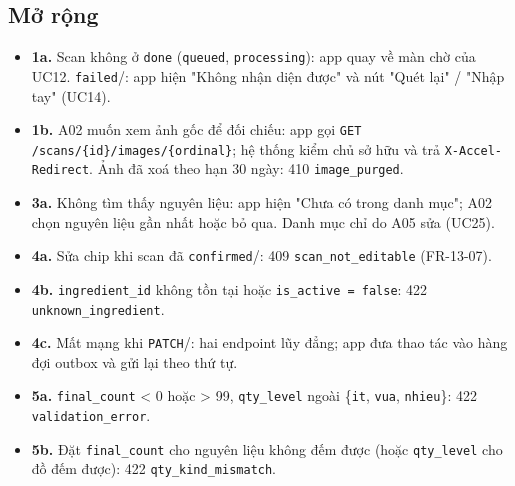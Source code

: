 \subsection{Mở rộng}
\begin{itemize}
\item \textbf{1a.} Scan không ở {\small\texttt{done}} ({\small\texttt{queued}}, {\small\texttt{processing}}): app quay về màn chờ của UC12. {\small\texttt{failed}}/: app hiện "Không nhận diện được" và nút "Quét lại" /\allowbreak{} "Nhập tay" (UC14).
\item \textbf{1b.} A02 muốn xem ảnh gốc để đối chiếu: app gọi {\small\texttt{GET /\allowbreak{}\allowbreak{}scans/\allowbreak{}\allowbreak{}\{id\}/\allowbreak{}\allowbreak{}images/\allowbreak{}\allowbreak{}\{ordinal\}}}; hệ thống kiểm chủ sở hữu và trả {\small\texttt{X-\allowbreak{}Accel-\allowbreak{}Redirect}}. Ảnh đã xoá theo hạn 30 ngày: 410 {\small\texttt{image\_\allowbreak{}\allowbreak{}purged}}.
\item \textbf{3a.} Không tìm thấy nguyên liệu: app hiện "Chưa có trong danh mục"; A02 chọn nguyên liệu gần nhất hoặc bỏ qua. Danh mục chỉ do A05 sửa (UC25).
\item \textbf{4a.} Sửa chip khi scan đã {\small\texttt{confirmed}}/: 409 {\small\texttt{scan\_\allowbreak{}\allowbreak{}not\_\allowbreak{}\allowbreak{}editable}} (FR-\allowbreak{}13-\allowbreak{}07).
\item \textbf{4b.} {\small\texttt{ingredient\_\allowbreak{}\allowbreak{}id}} không tồn tại hoặc {\small\texttt{is\_\allowbreak{}\allowbreak{}active = false}}: 422 {\small\texttt{unknown\_\allowbreak{}\allowbreak{}ingredient}}.
\item \textbf{4c.} Mất mạng khi {\small\texttt{PATCH}}/: hai endpoint lũy đẳng; app đưa thao tác vào hàng đợi outbox và gửi lại theo thứ tự.
\item \textbf{5a.} {\small\texttt{final\_\allowbreak{}\allowbreak{}count}} < 0 hoặc > 99, {\small\texttt{qty\_\allowbreak{}\allowbreak{}level}} ngoài \{{\small\texttt{it}}, {\small\texttt{vua}}, {\small\texttt{nhieu}}\}: 422 {\small\texttt{validation\_\allowbreak{}\allowbreak{}error}}.
\item \textbf{5b.} Đặt {\small\texttt{final\_\allowbreak{}\allowbreak{}count}} cho nguyên liệu không đếm được (hoặc {\small\texttt{qty\_\allowbreak{}\allowbreak{}level}} cho đồ đếm được): 422 {\small\texttt{qty\_\allowbreak{}\allowbreak{}kind\_\allowbreak{}\allowbreak{}mismatch}}.

\end{itemize}
